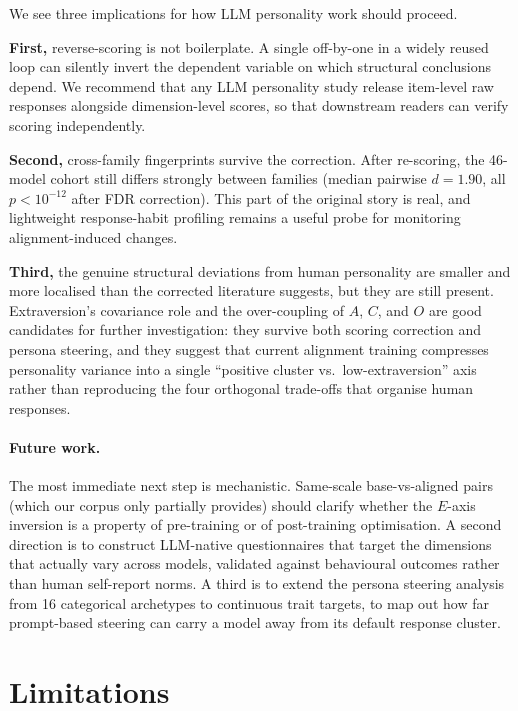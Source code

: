 \documentclass[11pt]{article}
\begin{document}
We see three implications for how LLM personality work should proceed.

\textbf{First,} reverse-scoring is not boilerplate.
A single off-by-one in a widely reused loop can silently invert the dependent variable on which structural conclusions depend.
We recommend that any LLM personality study release item-level raw responses alongside dimension-level scores, so that downstream readers can verify scoring independently.

\textbf{Second,} cross-family fingerprints survive the correction.
After re-scoring, the 46-model cohort still differs strongly between families (median pairwise $d = 1.90$, all $p < 10^{-12}$ after FDR correction).
This part of the original story is real, and lightweight response-habit profiling remains a useful probe for monitoring alignment-induced changes.

\textbf{Third,} the genuine structural deviations from human personality are smaller and more localised than the corrected literature suggests, but they are still present.
Extraversion's covariance role and the over-coupling of $A$, $C$, and $O$ are good candidates for further investigation: they survive both scoring correction and persona steering, and they suggest that current alignment training compresses personality variance into a single ``positive cluster vs.\ low-extraversion'' axis rather than reproducing the four orthogonal trade-offs that organise human responses.

\paragraph{Future work.}
The most immediate next step is mechanistic.
Same-scale base-vs-aligned pairs (which our corpus only partially provides) should clarify whether the $E$-axis inversion is a property of pre-training or of post-training optimisation.
A second direction is to construct LLM-native questionnaires that target the dimensions that actually vary across models, validated against behavioural outcomes rather than human self-report norms.
A third is to extend the persona steering analysis from 16 categorical archetypes to continuous trait targets, to map out how far prompt-based steering can carry a model away from its default response cluster.

\section{Limitations}
\label{sec:limitations}
\end{document}

